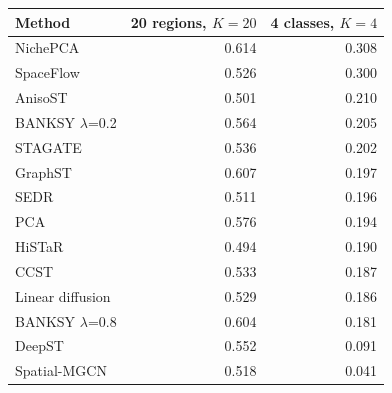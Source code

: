 \footnotesize
\begin{tabular}{lrr}
\toprule
Method & 20 regions, $K=20$ & 4 classes, $K=4$ \\
\midrule
NichePCA & 0.614 & 0.308 \\
SpaceFlow & 0.526 & 0.300 \\
AnisoST & 0.501 & 0.210 \\
BANKSY $\lambda$=0.2 & 0.564 & 0.205 \\
STAGATE & 0.536 & 0.202 \\
GraphST & 0.607 & 0.197 \\
SEDR & 0.511 & 0.196 \\
PCA & 0.576 & 0.194 \\
HiSTaR & 0.494 & 0.190 \\
CCST & 0.533 & 0.187 \\
Linear diffusion & 0.529 & 0.186 \\
BANKSY $\lambda$=0.8 & 0.604 & 0.181 \\
DeepST & 0.552 & 0.091 \\
Spatial-MGCN & 0.518 & 0.041 \\
\bottomrule
\end{tabular}
